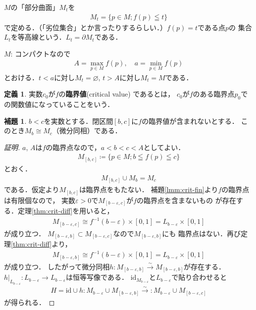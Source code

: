 \documentclass[11pt, a4paper, dvipdfmx]{jsarticle}
\theoremstyle{definition}
\newcommand{\p}{\partial}
\newcommand{\e}{\varepsilon} %
\newcommand{\emp}{\varnothing}
\newcommand{\mapres}[2]{\left. #1 \right|_{#2}}
\newcommand{\id}{\mathrm{id}}
\theoremstyle{mystyle}
\newtheorem{DFN}[Axiom]{定義}
\newtheorem{LMM}[Axiom]{補題}
\numberwithin{equation}{section} %
\begin{document}
$M$の「部分曲面」$M_t$を
\begin{align}
    M_t=\{p\in M; f(p)\leqq t\}
\end{align}
で定める．（「劣位集合」とか言ったりするらしい．）$f(p)=t$である点$p$の
集合$L_t$を等高線という．$L_t=\p M_t$である．

$M$: コンパクトなので
\begin{align*}
    A=\max_{p\in M}f(p),\quad a=\min_{p\in M}f(p)
\end{align*}
とおける．$t<a$に対し$M_t=\emp$, $t>A$に対し$M_t=M$である．

\begin{DFN}
    実数$c_0$が$f$の\textbf{臨界値}(critical value) であるとは，
    $c_0$が$f$のある臨界点$p_0$での関数値になっていることをいう．
\end{DFN}

\begin{LMM}
    $b<c$を実数とする．閉区間$[b,c]$に$f$の臨界値が含まれないとする．
    このとき$M_b\cong M_c$（微分同相）である．
\end{LMM}

\begin{proof}[証明]
    $a$, $A$は$f$の臨界点なので，$a<b<c<A$としてよい．
    \begin{align}
        M_{[b,c]}\coloneqq\{p\in M; b\leqq f(p)\leqq c\}
    \end{align}
    とおく．
    \begin{align}
        M_{[b,c]}\cup M_{b}=M_c
    \end{align}
    である．仮定より$M_{[b,c]}$は臨界点をもたない．
    補題\ref{lmm:crit-fin}より$f$の臨界点は有限個なので，
    実数$\e>0$で$M_{[b-\e,c]}$が$f$の臨界点を含まないもの
    が存在する．定理\ref{thm:crit-diff}を用いると，
    \begin{align*}
        M_{[b-\e,c]}\cong f^{-1}(b-\e)\times[0,1]=L_{b-\e}\times[0,1]
    \end{align*}
    が成り立つ．
    $M_{[b-\e,b]}\subset M_{[b-\e,c]}$なので$M_{[b-\e,b]}$にも
    臨界点はない．再び定理\ref{thm:crit-diff}より，
    \begin{align*}
        M_{[b-\e,b]}\cong f^{-1}(b-\e)\times[0,1]=L_{b-\e}\times[0,1]
    \end{align*}
    が成り立つ．
    したがって微分同相$h\colon M_{[b-\e,b]}\overset{\sim}{\longrightarrow} M_{[b-\e,b]}$が存在する．
    $\mapres{h}{L_{b-\e}}\colon L_{b-\e}\to L_{b-\e}$は恒等写像である．
    $\id_{M_{b-\e}}$と$L_{b-\e}$で貼り合わせると
    \begin{align*}
        H=\id\cup h\colon M_{b-\e}\cup M_{[b-\e,b]}
        \overset{\sim}{\longrightarrow}
        \colon M_{b-\e}\cup M_{[b-\e,c]}
    \end{align*}
    が得られる．
\end{proof}
\end{document}
